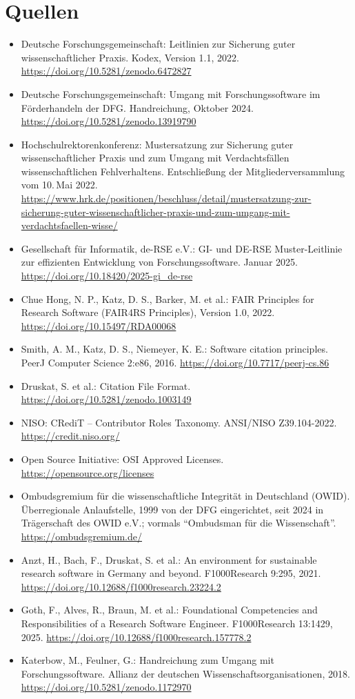 \documentclass[a4paper, fontsize=11pt]{scrartcl}
\begin{document}
\section{Quellen}
\begin{itemize}\small
  \item[{[DFG22]}] Deutsche Forschungsgemeinschaft: Leitlinien zur Sicherung guter wissenschaftlicher Praxis. Kodex, Version 1.1, 2022. \url{https://doi.org/10.5281/zenodo.6472827}
  \item[{[DFG24]}] Deutsche Forschungsgemeinschaft: Umgang mit Forschungssoftware im Förderhandeln der DFG. Handreichung, Oktober 2024. \url{https://doi.org/10.5281/zenodo.13919790}
  \item[{[HRK22]}] Hochschulrektorenkonferenz: Mustersatzung zur Sicherung guter wissenschaftlicher Praxis und zum Umgang mit Verdachtsfällen wissenschaftlichen Fehlverhaltens. Entschließung der Mitgliederversammlung vom 10.\,Mai 2022. \url{https://www.hrk.de/positionen/beschluss/detail/mustersatzung-zur-sicherung-guter-wissenschaftlicher-praxis-und-zum-umgang-mit-verdachtsfaellen-wisse/}
  \item[{[GI25]}] Gesellschaft für Informatik, de-RSE e.V.: GI- und DE-RSE Muster-Leitlinie zur effizienten Entwicklung von Forschungssoftware. Januar 2025. \url{https://doi.org/10.18420/2025-gi_de-rse}
  \item[{[FAIR22]}] Chue Hong, N. P., Katz, D. S., Barker, M. et al.: FAIR Principles for Research Software (FAIR4RS Principles), Version 1.0, 2022. \url{https://doi.org/10.15497/RDA00068}
  \item[{[SKN16]}] Smith, A. M., Katz, D. S., Niemeyer, K. E.: Software citation principles. PeerJ Computer Science 2:e86, 2016. \url{https://doi.org/10.7717/peerj-cs.86}
  \item[{[CFF]}] Druskat, S. et al.: Citation File Format. \url{https://doi.org/10.5281/zenodo.1003149}
  \item[{[CRediT]}] NISO: CRediT -- Contributor Roles Taxonomy. ANSI/NISO Z39.104-2022. \url{https://credit.niso.org/}
  \item[{[OSI]}] Open Source Initiative: OSI Approved Licenses. \url{https://opensource.org/licenses}
  \item[{[OWID]}] Ombudsgremium für die wissenschaftliche Integrität in Deutschland (OWID). Überregionale Anlaufstelle, 1999 von der DFG eingerichtet, seit 2024 in Trägerschaft des OWID e.V.; vormals \enquote{Ombudsman für die Wissenschaft}. \url{https://ombudsgremium.de/}
  \item[{[Anzt21]}] Anzt, H., Bach, F., Druskat, S. et al.: An environment for sustainable research software in Germany and beyond. F1000Research 9:295, 2021. \url{https://doi.org/10.12688/f1000research.23224.2}
  \item[{[Goth25]}] Goth, F., Alves, R., Braun, M. et al.: Foundational Competencies and Responsibilities of a Research Software Engineer. F1000Research 13:1429, 2025. \url{https://doi.org/10.12688/f1000research.157778.2}
  \item[{[KF18]}] Katerbow, M., Feulner, G.: Handreichung zum Umgang mit Forschungssoftware. Allianz der deutschen Wissenschaftsorganisationen, 2018. \url{https://doi.org/10.5281/zenodo.1172970}
\end{itemize}
\end{document}
